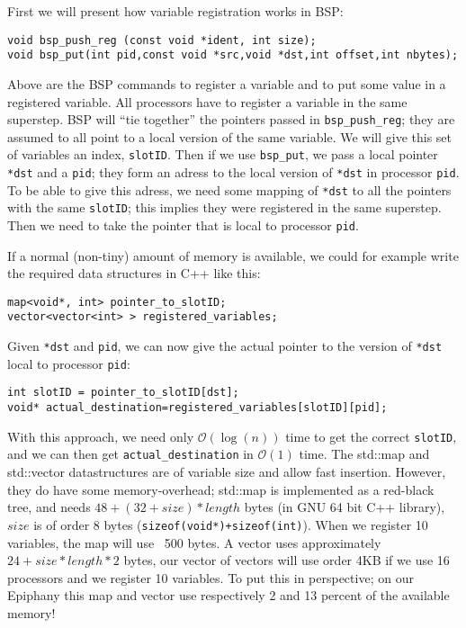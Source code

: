 \documentclass[fleqn]{article}
\renewcommand{\(}{\left(}
\renewcommand{\)}{\right)}
\begin{document}
First we will present how variable registration works in BSP:
\\
\begin{lstlisting}
void bsp_push_reg (const void *ident, int size);
void bsp_put(int pid,const void *src,void *dst,int offset,int nbytes);
\end{lstlisting}
Above are the BSP commands to register a variable and to put some value in a registered variable.
All processors have to register a variable in the same superstep. BSP will ``tie together'' the pointers passed in \texttt{bsp\_push\_reg}; they are assumed to all point to a local version of the same variable. We will give this set of variables an index, \texttt{slotID}. Then if we use \texttt{bsp\_put}, we pass a local pointer \texttt{*dst} and a \texttt{\texttt{pid}}; they form an adress to the local version of \texttt{*dst} in processor \texttt{pid}. To be able to give this adress, we need some mapping of \texttt{*dst} to all the pointers with the same \texttt{slotID}; this implies they were registered in the same superstep. Then we need to take the pointer that is local to processor \texttt{pid}.

If a normal (non-tiny) amount of memory is available, we could for example write the required data structures in C++ like this:
\begin{lstlisting}
map<void*, int> pointer_to_slotID;
vector<vector<int> > registered_variables;
\end{lstlisting}
Given \texttt{*dst} and \texttt{pid}, we can now give the actual pointer to the version of \texttt{*dst} local to processor \texttt{pid}:
\begin{lstlisting}
int slotID = pointer_to_slotID[dst];
void* actual_destination=registered_variables[slotID][pid];
\end{lstlisting}
With this approach, we need only $\mathcal{O}(\log(n))$ time to get the correct \texttt{slotID}, and we can then get \texttt{actual\_destination} in $\mathcal{O}(1)$ time. The std::map and std::vector datastructures are of variable size and allow fast insertion. However, they do have some memory-overhead; std::map is implemented as a red-black tree, and needs $48+(32+size)*length$ bytes (in GNU 64 bit C++ library), $size$ is of order 8 bytes (\texttt{sizeof(void*)+sizeof(int)}). When we register 10 variables, the map will use ~500 bytes. A vector uses approximately $24+size*length*2$ bytes, our vector of vectors will use order 4KB if we use 16 processors and we register 10 variables. To put this in perspective; on our Epiphany this map and vector use respectively 2 and 13 percent of the available memory!
\end{document}
